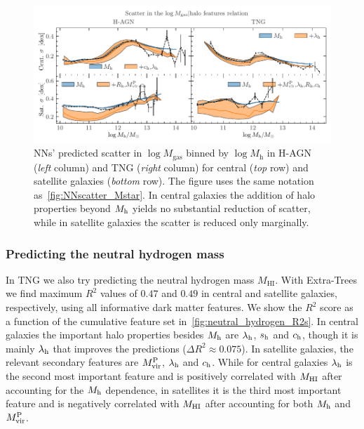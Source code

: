 \documentclass[useAMS,usenatbib]{mnras}
\begin{document}
\begin{figure}
    \centering
    \includegraphics[width=\textwidth]{Figures/NN_scatter_mgas.pdf}
    \caption{\acp{NN}' predicted scatter in $\log M_\mathrm{gas}$ binned by $\log M_\mathrm{h}$ in H-AGN (\emph{left} column) and TNG (\emph{right} column) for central (\emph{top} row) and satellite galaxies (\emph{bottom} row). The figure uses the same notation as~\cref{fig:NNscatter_Mstar}. In central galaxies the addition of halo properties beyond $M_{\rm h}$ yields no substantial reduction of scatter, while in satellite galaxies the scatter is reduced only marginally.}
    \label{fig:NNscatter_Mgas}
\end{figure}


\subsubsection{Predicting the neutral hydrogen mass}

In TNG we also try predicting the neutral hydrogen mass $M_\mathrm{HI}$. With Extra-Trees we find maximum $R^2$ values of $0.47$ and $0.49$ in central and satellite galaxies, respectively, using all informative dark matter features. We show the $R^2$ score as a function of the cumulative feature set in~\cref{fig:neutral_hydrogen_R2s}. In central galaxies the important halo properties besides $M_{\rm h}$ are $\lambda_{\rm h}$, $s_{\rm h}$ and $c_{\rm h}$, though it is mainly  $\lambda_{\rm h}$ that improves the predictions ($\Delta R^2 \approx 0.075$). In satellite galaxies, the relevant secondary features are $M_{\rm vir}^{\rm P}$, $\lambda_{\rm h}$ and $c_{\rm h}$. While for central galaxies $\lambda_{\rm h}$ is the second most important feature and is positively correlated with $M_{\rm HI}$ after accounting for the $M_{\rm h}$ dependence, in satellites it is the third most important feature and is negatively correlated with $M_{\rm HI}$ after accounting for both $M_{\rm h}$ and $M_{\rm vir}^{\rm P}$.
\end{document}
